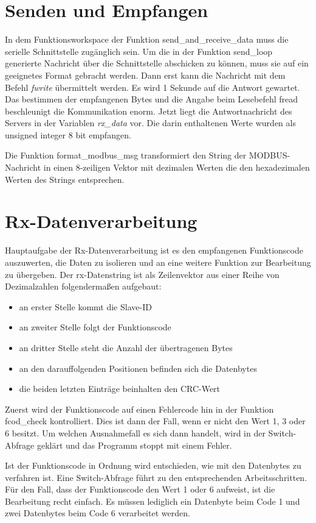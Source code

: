 \section{Senden und Empfangen}

In dem Funktionsworkspace der Funktion \textsf{send\_and\_receive\_data} muss die serielle Schnittstelle zugänglich sein. Um die in der Funktion \textsf{send\_loop} generierte Nachricht über die Schnittstelle abschicken zu können, muss sie auf ein geeignetes Format gebracht werden. Dann erst kann die Nachricht mit dem Befehl \textit{fwrite} übermittelt werden. Es wird 1 Sekunde auf die Antwort gewartet. Das bestimmen der empfangenen Bytes und die Angabe beim Lesebefehl \textsf{fread} beschleunigt die Kommunikation enorm. Jetzt liegt die Antwortnachricht des Servers in der Variablen \textit{rx\_data} vor. Die darin enthaltenen Werte wurden als unsigned integer 8 bit empfangen.      

Die Funktion \textsf{format\_modbus\_msg} transformiert den String der MODBUS-Nachricht in einen 8-zeiligen Vektor mit dezimalen Werten die den hexadezimalen Werten des Strings entsprechen. 
\section{Rx-Datenverarbeitung}

Hauptaufgabe der Rx-Datenverarbeitung ist es den empfangenen Funktionscode auszuwerten, die Daten zu isolieren und an eine weitere Funktion zur Bearbeitung zu übergeben. Der rx-Datenstring ist als Zeilenvektor aus einer Reihe von Dezimalzahlen folgendermaßen aufgebaut:
\begin{itemize}
\item an erster Stelle kommt die Slave-ID 
\item an zweiter Stelle folgt der Funktionscode 
\item an dritter Stelle steht die Anzahl der übertragenen Bytes
\item an den darauffolgenden Positionen befinden sich die Datenbytes
\item die beiden letzten Einträge beinhalten den CRC-Wert
\end{itemize}

Zuerst wird der Funktionscode auf einen Fehlercode hin in der Funktion \textsf{fcod\_check} kontrolliert. Dies ist dann der Fall, wenn er nicht den Wert 1, 3 oder 6 besitzt. Um welchen Ausnahmefall es sich dann handelt, wird in der Switch-Abfrage geklärt und das Programm stoppt mit einem Fehler.  

Ist der Funktionscode in Ordnung wird entschieden, wie mit den Datenbytes zu verfahren ist. Eine Switch-Abfrage führt zu den entsprechenden Arbeitsschritten. Für den Fall, dass der Funktionscode den Wert 1 oder 6 aufweist, ist die Bearbeitung recht einfach. Es müssen lediglich ein Datenbyte beim Code 1 und zwei Datenbytes beim Code 6 verarbeitet werden.    


